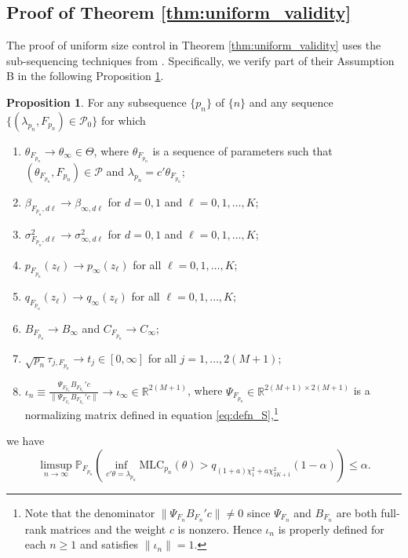 \documentclass[11pt]{article}
\theoremstyle{definition}
\newtheorem{proposition}{Proposition}[section]
\newcommand{\R}{\ensuremath{\mathbb{R}}}
\newcommand{\Prob}{\ensuremath{\mathbb{P}}} %
\newcommand{\0}{\ensuremath{\mathbf{0}}}
\begin{document}
\begin{bibunit}
\subsection{Proof of Theorem \ref{thm:uniform_validity}}
The proof of uniform size control in Theorem \ref{thm:uniform_validity} uses the sub-sequencing techniques from \cite{andrews/cheng/guggenberger:2020}. Specifically, we verify part of their Assumption B in the following Proposition \ref{prop:subsequence_MLC_validity}. 

%


\begin{proposition}
\label{prop:subsequence_MLC_validity}
For any subsequence $\{p_n\}$ of $\{n\}$ and any sequence $\{(\lambda_{p_n}, F_{p_n}) \in \mathcal{P}_0\}$ for which 
\begin{enumerate}
	\item $\theta_{F_{p_n}} \to \theta_\infty \in \Theta$, where $\theta_{F_{p_n}}$ is a sequence of parameters such that $(\theta_{F_{p_n}}, F_{p_n}) \in \mathcal{P}$ and $\lambda_{{p_n}} = c'\theta_{F_{p_n}}$;
	\item $\beta_{F_{p_n}, d\ell} \to \beta_{\infty,d\ell}$ for $d = 0,1$ and $\ell = 0,1,\ldots,K$;
	\item $\sigma^2_{F_{p_n}, d\ell} \to \sigma^2_{\infty, d\ell}$ for $d = 0,1$ and $\ell = 0,1,\ldots,K$;
	\item $p_{F_{p_n}}(z_\ell) \to p_\infty(z_\ell)$ for all $\ell = 0,1,\ldots,K$;
	\item $q_{F_{p_n}}(z_\ell) \to q_{\infty}(z_\ell)$ for all $\ell = 0,1,\ldots,K$;
%
%
	\item $B_{F_{p_n}} \to B_{\infty}$ and $C_{F_{p_n}} \to C_{\infty}$;
	\item $\sqrt{p_n}\tau_{j,F_{p_n}} \to t_j \in [0,\infty]$ for all $j = 1, \ldots, 2(M+1)$;
	\item $\iota_{n} \equiv \frac{\Psi_{F_{p_n}} B_{F_{p_n}}'c}{\|\Psi_{F_{p_n}} B_{F_{p_n}}'c\|}\to \iota_\infty \in \R^{2(M+1)}$, where $\Psi_{F_{p_n}} \in \R^{2(M+1)\times 2(M+1)}$ is a normalizing matrix defined in equation \eqref{eq:defn_S},\footnote{Note that the denominator $\|\Psi_{F_n}B_{F_n}'c\| \neq 0$ since $\Psi_{F_n}$ and $B_{F_n}$ are both full-rank matrices and the weight $c$ is nonzero. Hence $\iota_n$ is properly defined for each $n \geq 1$ and satisfies $\|\iota_n\| = 1$.}
\end{enumerate}
we have 
\[
	\limsup_{n\to\infty} \Prob_{F_{p_n}}\left(\inf_{c'\theta = \lambda_{p_n}} \text{MLC}_{p_n}(\theta) > q_{(1+a)\chi_1^2 + a\chi_{2K+1}^2}(1-\alpha)\right) \leq \alpha.
\]
\end{proposition}


\end{bibunit}
\end{document}

